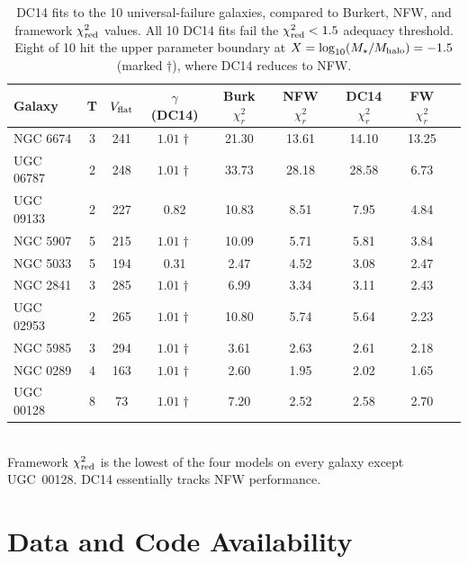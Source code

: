 \begin{table}
\centering
\caption{DC14 fits to the 10 universal-failure galaxies, compared to Burkert, NFW, and framework $\chi^2_{\rm red}$ values. All 10 DC14 fits fail the $\chi^2_{\rm red} < 1.5$ adequacy threshold. Eight of 10 hit the upper parameter boundary at $X = \log_{10}(M_\star/M_{\rm halo}) = -1.5$ (marked $\dagger$), where DC14 reduces to NFW.}
\label{tab:dc14}
\begin{tabular}{lcccccccc}
\toprule
Galaxy & T & $V_{\rm flat}$ & $\gamma$ (DC14) & Burk $\chi^2_r$ & NFW $\chi^2_r$ & DC14 $\chi^2_r$ & FW $\chi^2_r$ \\
\midrule
NGC 6674  & 3 & 241 & $1.01\dagger$ & 21.30 & 13.61 & 14.10 & 13.25 \\
UGC 06787 & 2 & 248 & $1.01\dagger$ & 33.73 & 28.18 & 28.58 & 6.73 \\
UGC 09133 & 2 & 227 & 0.82          & 10.83 & 8.51  & 7.95  & 4.84 \\
NGC 5907  & 5 & 215 & $1.01\dagger$ & 10.09 & 5.71  & 5.81  & 3.84 \\
NGC 5033  & 5 & 194 & 0.31          & 2.47  & 4.52  & 3.08  & 2.47 \\
NGC 2841  & 3 & 285 & $1.01\dagger$ & 6.99  & 3.34  & 3.11  & 2.43 \\
UGC 02953 & 2 & 265 & $1.01\dagger$ & 10.80 & 5.74  & 5.64  & 2.23 \\
NGC 5985  & 3 & 294 & $1.01\dagger$ & 3.61  & 2.63  & 2.61  & 2.18 \\
NGC 0289  & 4 & 163 & $1.01\dagger$ & 2.60  & 1.95  & 2.02  & 1.65 \\
UGC 00128 & 8 & 73  & $1.01\dagger$ & 7.20  & 2.52  & 2.58  & 2.70 \\
\bottomrule
\end{tabular}
\\[0.5em]
\footnotesize{Framework $\chi^2_{\rm red}$ is the lowest of the four models on every galaxy except UGC~00128. DC14 essentially tracks NFW performance.}
\end{table}


\section*{Data and Code Availability}
\label{sec:data-availability}

